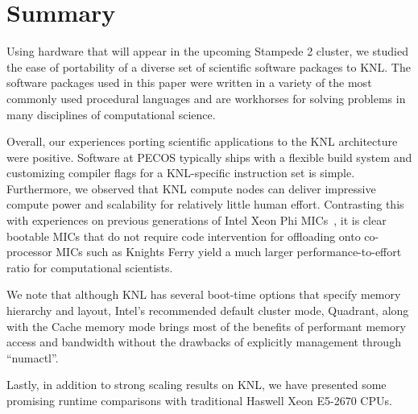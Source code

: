 \section{Summary}
\label{sec:summary}

Using hardware that will appear in the upcoming Stampede 2 cluster, we studied
the ease of portability of a diverse set of scientific software packages to
KNL.  The software packages used in this paper were written in a variety of the
most commonly used procedural languages and are workhorses for solving problems
in many disciplines of computational science.

Overall, our experiences porting scientific applications to the KNL
architecture were positive.  Software at PECOS typically ships with a
flexible build system and customizing compiler flags for a KNL-specific
instruction set is simple.  Furthermore, we observed that KNL compute nodes can
deliver impressive compute power and scalability for relatively little human
effort.  Contrasting this with experiences on previous generations of Intel
Xeon Phi MICs~\cite{schulz2012early}, it is clear bootable MICs that do not
require code intervention for offloading onto co-processor MICs such as Knights
Ferry yield a much larger performance-to-effort ratio for computational
scientists.

We note that although KNL has several boot-time options that specify memory
hierarchy and layout, Intel's recommended default cluster mode, Quadrant, along
with the Cache memory mode brings most of the benefits of performant memory access 
and bandwidth without the drawbacks of explicitly management through ``numactl''.

Lastly, in addition to strong scaling results on KNL, we have presented some
promising runtime comparisons with traditional Haswell Xeon E5-2670 CPUs.

